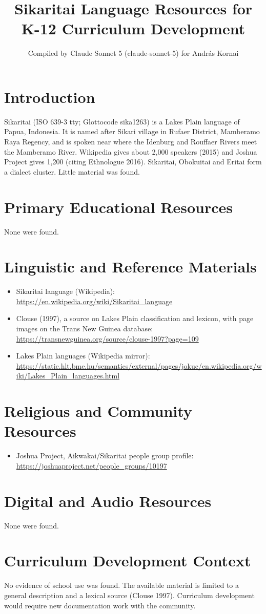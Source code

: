 \documentclass[12pt]{article}
\title{Sikaritai Language Resources for K-12 Curriculum Development}
\author{Compiled by Claude Sonnet 5 (claude-sonnet-5) for Andr\'as Kornai}
\date{}
\begin{document}
\maketitle

\section{Introduction}
Sikaritai (ISO 639-3 tty; Glottocode sika1263) is a Lakes Plain language of Papua, Indonesia. It is named after Sikari village in Rufaer District, Mamberamo Raya Regency, and is spoken near where the Idenburg and Rouffaer Rivers meet the Mamberamo River. Wikipedia gives about 2,000 speakers (2015) and Joshua Project gives 1,200 (citing Ethnologue 2016). Sikaritai, Obokuitai and Eritai form a dialect cluster. Little material was found.

\section{Primary Educational Resources}
None were found.

\section{Linguistic and Reference Materials}
\begin{itemize}
\item Sikaritai language (Wikipedia): \url{https://en.wikipedia.org/wiki/Sikaritai_language}
\item Clouse (1997), a source on Lakes Plain classification and lexicon, with page images on the Trans New Guinea database: \url{https://transnewguinea.org/source/clouse-1997?page=109}
\item Lakes Plain languages (Wikipedia mirror): \url{https://static.hlt.bme.hu/semantics/external/pages/jokuc/en.wikipedia.org/wiki/Lakes_Plain_languages.html}
\end{itemize}

\section{Religious and Community Resources}
\begin{itemize}
\item Joshua Project, Aikwakai/Sikaritai people group profile: \url{https://joshuaproject.net/people_groups/10197}
\end{itemize}

\section{Digital and Audio Resources}
None were found.

\section{Curriculum Development Context}
No evidence of school use was found. The available material is limited to a general description and a lexical source (Clouse 1997). Curriculum development would require new documentation work with the community.
\end{document}
